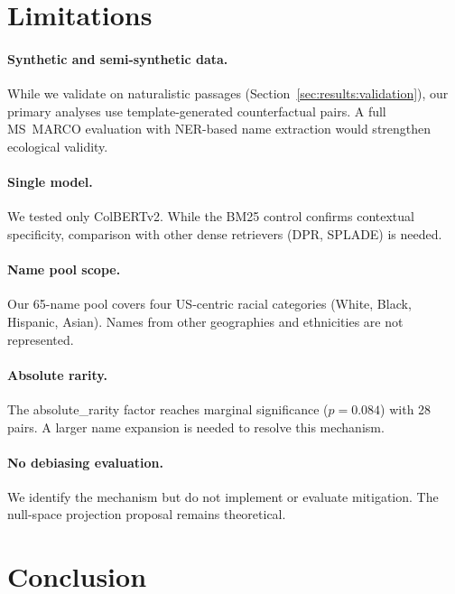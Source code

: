 \documentclass[sigconf,review,anonymous]{acmart}
\begin{document}
\section{Limitations}
\label{sec:limitations}

\paragraph{Synthetic and semi-synthetic data.} While we validate on naturalistic passages (Section~\ref{sec:results:validation}), our primary analyses use template-generated counterfactual pairs. A full MS~MARCO evaluation with NER-based name extraction would strengthen ecological validity.

\paragraph{Single model.} We tested only ColBERTv2. While the BM25 control confirms contextual specificity, comparison with other dense retrievers (DPR, SPLADE) is needed.

\paragraph{Name pool scope.} Our 65-name pool covers four US-centric racial categories (White, Black, Hispanic, Asian). Names from other geographies and ethnicities are not represented.

\paragraph{Absolute rarity.} The absolute\_rarity factor reaches marginal significance ($p = 0.084$) with 28 pairs. A larger name expansion is needed to resolve this mechanism.

\paragraph{No debiasing evaluation.} We identify the mechanism but do not implement or evaluate mitigation. The null-space projection proposal remains theoretical.


\section{Conclusion}
\label{sec:conclusion}
\end{document}
